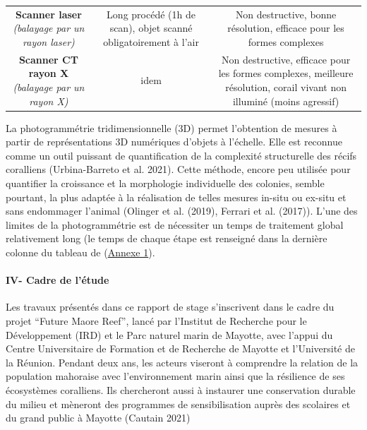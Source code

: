\documentclass[]{article}
\let\oldparagraph\paragraph
\renewcommand{\paragraph}[1]{\oldparagraph{#1}\mbox{}}
\begin{document}
\begin{longtable}[]{@{}ccc@{}}
\begin{minipage}[t]{0.29\columnwidth}
\textbf{Scanner laser} \emph{(balayage par un rayon laser)}\strut
\end{minipage} & \begin{minipage}[t]{0.29\columnwidth}\centering
Long procédé (1h de scan), objet scanné obligatoirement à l'air\strut
\end{minipage} & \begin{minipage}[t]{0.33\columnwidth}\centering
Non destructive, bonne résolution, efficace pour les formes
complexes\strut
\end{minipage}\tabularnewline
\begin{minipage}[t]{0.29\columnwidth}\centering
\textbf{Scanner CT rayon X} \emph{(balayage par un rayon X)}\strut
\end{minipage} & \begin{minipage}[t]{0.29\columnwidth}\centering
idem\strut
\end{minipage} & \begin{minipage}[t]{0.33\columnwidth}\centering
Non destructive, efficace pour les formes complexes, meilleure
résolution, corail vivant non illuminé (moins agressif)\strut
\end{minipage}\tabularnewline
\bottomrule
\end{longtable}

La photogrammétrie tridimensionnelle (3D) permet l'obtention de mesures
à partir de représentations 3D numériques d'objets à l'échelle. Elle est
reconnue comme un outil puissant de quantification de la complexité
structurelle des récifs coralliens (Urbina-Barreto et al. 2021). Cette
méthode, encore peu utilisée pour quantifier la croissance et la
morphologie individuelle des colonies, semble pourtant, la plus adaptée
à la réalisation de telles mesures in-situ ou ex-situ et sans endommager
l'animal (Olinger et al. (2019), Ferrari et al. (2017)). L'une des
limites de la photogrammétrie est de nécessiter un temps de traitement
global relativement long (le temps de chaque étape est renseigné dans la
dernière colonne du tableau de
(\protect\hyperlink{Annexeux5cux25201}{Annexe 1}).

\hypertarget{iv--cadre-de-luxe9tude}{%
\paragraph{IV- Cadre de l'étude }\label{iv--cadre-de-luxe9tude}}

Les travaux présentés dans ce rapport de stage s'inscrivent dans le
cadre du projet ``Future Maore Reef'', lancé par l'Institut de Recherche
pour le Développement (IRD) et le Parc naturel marin de Mayotte, avec
l'appui du Centre Universitaire de Formation et de Recherche de Mayotte
et l'Université de la Réunion. Pendant deux ans, les acteurs viseront à
comprendre la relation de la population mahoraise avec l'environnement
marin ainsi que la résilience de ses écosystèmes coralliens. Ils
chercheront aussi à instaurer une conservation durable du milieu et
mèneront des programmes de sensibilisation auprès des scolaires et du
grand public à Mayotte (Cautain 2021)
\end{document}

